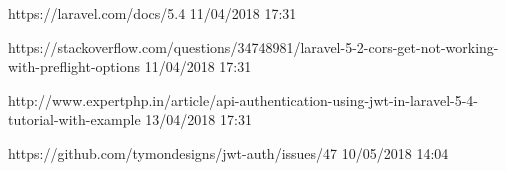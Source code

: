 \documentclass[12pt,a4paper,oneside]{book}
\begin{document}
\begin{thebibliography}{9}
	
	 https://laravel.com/docs/5.4 11/04/2018 17:31
	
	 https://stackoverflow.com/questions/34748981/laravel-5-2-cors-get-not-working-with-preflight-options 11/04/2018 17:31
	
	 http://www.expertphp.in/article/api-authentication-using-jwt-in-laravel-5-4-tutorial-with-example 13/04/2018 17:31 
	
	 https://github.com/tymondesigns/jwt-auth/issues/47 10/05/2018 14:04
	
	
	
	
	
	
\end{thebibliography}







\appendix














\renewcommand{\contentsname}{Table des matières} 
\setcounter{tocdepth}{3}
\tableofcontents
{}
\end{document}
